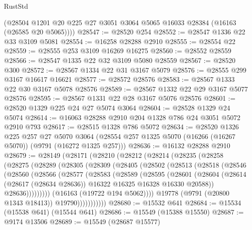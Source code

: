 \begin{lexlean}{RustStd}
\begin{coremodule}
      (@28504 @1201 @20 @225 @27 @3051 @3064 @5065 @16033 @28384 (@16163 (@26585 @20 @5065))))
@28547 := @28520 @254
@28552 := @28547 @1336 @22 @33 @3109 @5081
@28554 := @16258 @28288 @2910
@28555 := @28554 @22
@28559 := @28555 @253 @3109 @16269 @16275
@28560 := @28552 @28559
@28566 := @28547 @1335 @22 @32 @3109 @5080 @28559
@28567 := @28520 @300
@28572 := @28567 @1334 @22 @31 @3167 @5079
@28576 := @28555 @299 @3167 @16617 @16621
@28577 := @28572 @28576
@28583 := @28567 @1333 @22 @30 @3167 @5078 @28576
@28589 := @28567 @1332 @22 @29 @3167 @5077 @28576
@28595 := @28567 @1331 @22 @28 @3167 @5076 @28576
@28601 := @28520 @1329 @225 @24 @27 @5074 @3064
@28604 := @28528 @1329 @24 @5074
@28614 := @16063 @28288 @2910 @204 @1328 @786 @24 @3051 @5072 @2910 @793
@28617 := @28515 @1328 @786 @5072
@28634 := @28520
    @1326
    @225
    @257
    @27
    @5070
    @3064
    (@28554 @257 @1325 @5070 (@16266 (@16267 @5070)) (@9791 (@16272 @1325 @257)))
@28636 := @16132 @28288 @2910
@28679 := @28149
    (@28171
      (@28210
        (@28212
          (@28214
            (@28235
              (@28258
                (@28275
                  (@28289
                    (@28305
                      (@28309
                        (@28405
                          (@28502
                            (@28513
                              (@28518
                                (@28546
                                  (@28560
                                    (@28566
                                      (@28577
                                        (@28583
                                          (@28589
                                            (@28595
                                              (@28601
                                                (@28604
                                                  (@28614
                                                    (@28617 (@28634 @28636))
                                                    @16322
                                                    @16325
                                                    @16328
                                                    @16330
                                                    @20588))
                                                @28636)))))))))
                              (@16163 (@19722 @194 @5062))))
                          @19778
                          (@9791 (@20800 @1343 @18413))
                          @19790)))))))))))
@28680 := @15532 @641
@28684 := @15534 (@15538 @641) (@15544 @641)
@28686 := @15549 (@15388 @15550)
@28687 := @9174 @13506
@28689 := @15549 (@28687 @15577)

\end{coremodule}
\end{lexlean}
